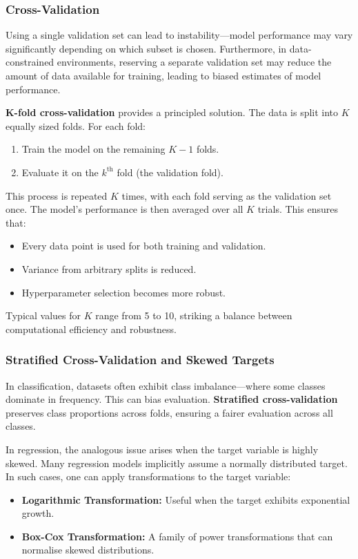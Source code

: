 \documentclass[9pt]{extarticle}
\begin{document}
\subsubsection*{Cross-Validation}

Using a single validation set can lead to instability—model performance may vary significantly depending on which subset is chosen. Furthermore, in data-constrained environments, reserving a separate validation set may reduce the amount of data available for training, leading to biased estimates of model performance.

\textbf{K-fold cross-validation} provides a principled solution. The data is split into $K$ equally sized folds. For each fold:
\begin{enumerate}
    \item Train the model on the remaining $K-1$ folds.
    \item Evaluate it on the $k^\text{th}$ fold (the validation fold).
\end{enumerate}
This process is repeated $K$ times, with each fold serving as the validation set once. The model’s performance is then averaged over all $K$ trials. This ensures that:
\begin{itemize}
    \item Every data point is used for both training and validation.
    \item Variance from arbitrary splits is reduced.
    \item Hyperparameter selection becomes more robust.
\end{itemize}

Typical values for $K$ range from 5 to 10, striking a balance between computational efficiency and robustness.

\subsubsection*{Stratified Cross-Validation and Skewed Targets}

In classification, datasets often exhibit class imbalance—where some classes dominate in frequency. This can bias evaluation. \textbf{Stratified cross-validation} preserves class proportions across folds, ensuring a fairer evaluation across all classes.

In regression, the analogous issue arises when the target variable is highly skewed. Many regression models implicitly assume a normally distributed target. In such cases, one can apply transformations to the target variable:
\begin{itemize}
    \item \textbf{Logarithmic Transformation:} Useful when the target exhibits exponential growth.
    \item \textbf{Box-Cox Transformation:} A family of power transformations that can normalise skewed distributions.
\end{itemize}
\end{document}
